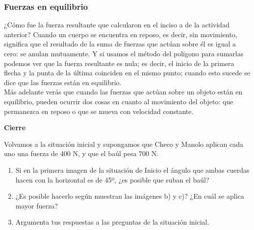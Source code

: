 \documentclass[11pt]{book}
\begin{document}
\subsubsection{Fuerzas en equilibrio}
¿Cómo fue la fuerza resultante que calcularon en el inciso a de la actividad anterior?
Cuando un cuerpo se encuentra en reposo, es decir, sin movimiento, significa que el
resultado de la suma de fuerzas que actúan sobre él es igual a cero: se anulan mutuamente.
Y si usamos el método del polígono para sumarlas podemos ver que la fuerza resultante es
nula; es decir, el inicio de la primera flecha y la punta de la última coinciden en el
mismo punto; cuando esto sucede se dice que las fuerzas están en equilibrio.\\

Más adelante verás que cuando las fuerzas que actúan sobre un objeto están en equilibrio,
pueden ocurrir dos cosas en cuanto al movimiento del objeto: que permanezca en reposo o
que se mueva con velocidad constante.\\

\begin{boxF}
    \begin{center}\bfseries \color{colorrds} Cierre\end{center}

    Volvamos a la situación inicial y supongamos que Checo y Manolo aplican cada uno una
    fuerza de 400 N, y que el baúl pesa 700 N.
    \begin{enumerate}
        \item Si en la primera imagen de la situación de Inicio el ángulo que
              ambas cuerdas hacen con la horizontal es de 45º, ¿es posible que suban el baúl?
        \item ¿Es posible hacerlo según muestran las imágenes b) y c)?
              ¿En cuál se aplica mayor fuerza?
        \item Argumenta tus respuestas a las preguntas de la situación inicial.
    \end{enumerate}

\end{boxF}

\newpage
\end{document}
